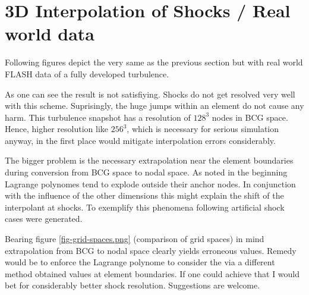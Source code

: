 \section{3D Interpolation of Shocks / Real world data}

Following figures depict the very same as the previous section but with real
world FLASH data of a fully developed turbulence.



As one can see the result is not satisfiying. Shocks do not get resolved very
well with this scheme. Suprisingly, the huge jumps within an element do not
cause any harm. This turbulence snapshot has a resolution of $128^3$ nodes in
BCG space. Hence, higher resolution like $256^3$, which is necessary for
serious simulation anyway, in the first place would mitigate interpolation
errors considerably.
 
The bigger problem is the necessary extrapolation near the element boundaries
during conversion from BCG space to nodal space. As noted in the beginning
Lagrange polynomes tend to explode outside their anchor nodes. In conjunction
with the influence of the other dimensions this might explain the shift of the
interpolant at shocks. To exemplify this phenomena following artificial shock
cases were generated.



Bearing figure \ref{fig-grid-spaces.png} (comparison of grid spaces) in mind
extrapolation from BCG to nodal space clearly yields erroneous values.  Remedy
would be to enforce the Lagrange polynome to consider the via a different
method obtained values at element boundaries. If one could achieve that I would
bet for considerably better shock resolution. Suggestions are welcome.
